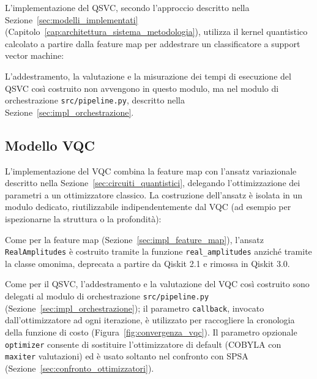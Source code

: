 L'implementazione del QSVC, secondo l'approccio descritto nella Sezione~\ref{sec:modelli_implementati} (Capitolo~\ref{cap:architettura_sistema_metodologia}), utilizza il kernel quantistico calcolato a partire dalla feature map per addestrare un classificatore a support vector machine:



L'addestramento, la valutazione e la misurazione dei tempi di esecuzione del QSVC così costruito non avvengono in questo modulo, ma nel modulo di orchestrazione \texttt{src/pipeline.py}, descritto nella Sezione~\ref{sec:impl_orchestrazione}.

\subsection{Modello VQC}
\label{sec:impl_vqc}

L'implementazione del VQC combina la feature map con l'ansatz variazionale descritto nella Sezione~\ref{sec:circuiti_quantistici}, delegando l'ottimizzazione dei parametri a un ottimizzatore classico. La costruzione dell'ansatz è isolata in un modulo dedicato, riutilizzabile indipendentemente dal VQC (ad esempio per ispezionarne la struttura o la profondità):



Come per la feature map (Sezione~\ref{sec:impl_feature_map}), l'ansatz \texttt{RealAmplitudes} è costruito tramite la funzione \texttt{real\_amplitudes} anziché tramite la classe omonima, deprecata a partire da Qiskit 2.1 e rimossa in Qiskit 3.0.



Come per il QSVC, l'addestramento e la valutazione del VQC così costruito sono delegati al modulo di orchestrazione \texttt{src/pipeline.py} (Sezione~\ref{sec:impl_orchestrazione}); il parametro \texttt{callback}, invocato dall'ottimizzatore ad ogni iterazione, è utilizzato per raccogliere la cronologia della funzione di costo (Figura~\ref{fig:convergenza_vqc}). Il parametro opzionale \texttt{optimizer} consente di sostituire l'ottimizzatore di default (COBYLA con \texttt{maxiter} valutazioni) ed è usato soltanto nel confronto con SPSA (Sezione~\ref{sec:confronto_ottimizzatori}).

